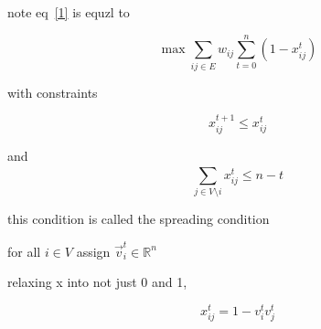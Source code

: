 \documentclass{article}
\theoremstyle{definition}
\begin{document}
note eq~\ref{1} is equzl to

\begin{equation}
    \max \sum_{ij\in E}^{}w_{ij}\sum_{t=0}^{n}(1-x_{ij}^t)
\end{equation}


with constraints

\begin{equation}
    x_{ij}^{t+1}\leq x_{ij}^{t}
\end{equation}

and \begin{equation}
    \sum_{j\in V\setminus i}^{}x_{ij}^t\leq n-t
\end{equation}


this condition is called the spreading condition


for all \(i\in V\) assign \(\vec v_i^t\in \mathbb R^n\)

relaxing x into not just 0 and 1,

\begin{equation}
    x_{ij}^t = 1-v_i^tv_j^t
\end{equation}
\end{document}
